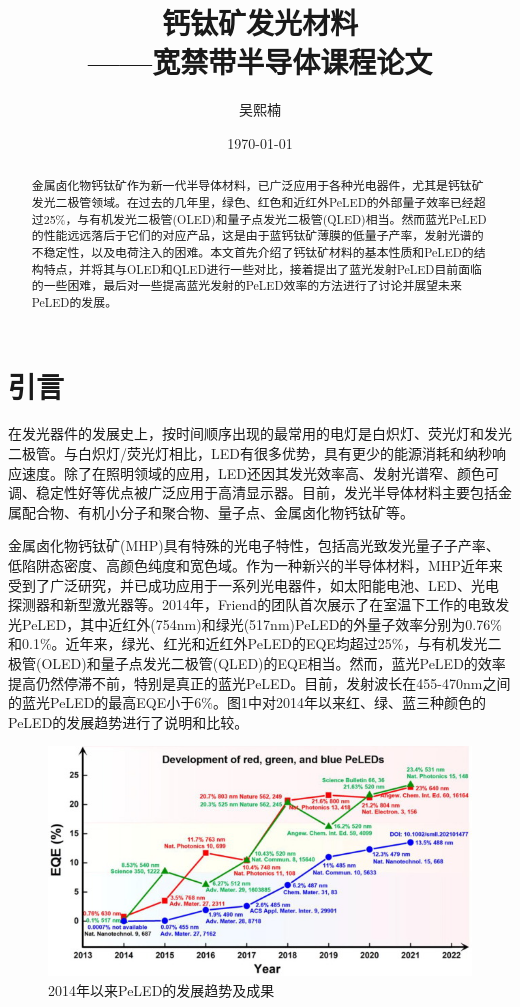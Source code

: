 \documentclass{phyasgn}\usepackage{nag}
\title{
  {钙钛矿发光材料}\\[-8pt]
    {\normalsize ——宽禁带半导体课程论文}
}
\author{吴熙楠}
\date{\today}
\begin{document}
\maketitle
\begin{abstract}
金属卤化物钙钛矿作为新一代半导体材料，已广泛应用于各种光电器件，尤其是钙钛矿发光二极管领域。在过去的几年里，绿色、红色和近红外PeLED的外部量子效率已经超过25\%，与有机发光二极管(OLED)和量子点发光二极管(QLED)相当。然而蓝光PeLED的性能远远落后于它们的对应产品，这是由于蓝钙钛矿薄膜的低量子产率，发射光谱的不稳定性，以及电荷注入的困难。本文首先介绍了钙钛矿材料的基本性质和PeLED的结构特点，并将其与OLED和QLED进行一些对比，接着提出了蓝光发射PeLED目前面临的一些困难，最后对一些提高蓝光发射的PeLED效率的方法进行了讨论并展望未来PeLED的发展。
\end{abstract}
\tableofcontents
\section{引言}
在发光器件的发展史上，按时间顺序出现的最常用的电灯是白炽灯、荧光灯和发光二极管。与白炽灯/荧光灯相比，LED有很多优势，具有更少的能源消耗和纳秒响应速度。除了在照明领域的应用，LED还因其发光效率高、发射光谱窄、颜色可调、稳定性好等优点被广泛应用于高清显示器。目前，发光半导体材料主要包括金属配合物、有机小分子和聚合物、量子点、金属卤化物钙钛矿等。
\par 金属卤化物钙钛矿(MHP)具有特殊的光电子特性，包括高光致发光量子子产率、低陷阱态密度、高颜色纯度和宽色域。作为一种新兴的半导体材料，MHP近年来受到了广泛研究，并已成功应用于一系列光电器件，如太阳能电池、LED、光电探测器和新型激光器等。2014年，Friend的团队首次展示了在室温下工作的电致发光PeLED，其中近红外(754nm)和绿光(517nm)PeLED的外量子效率分别为0.76\%和0.1\%。近年来，绿光、红光和近红外PeLED的EQE均超过25\%，与有机发光二极管(OLED)和量子点发光二极管(QLED)的EQE相当。然而，蓝光PeLED的效率提高仍然停滞不前，特别是真正的蓝光PeLED。目前，发射波长在455-470nm之间的蓝光PeLED的最高EQE小于6\%。图1中对2014年以来红、绿、蓝三种颜色的PeLED的发展趋势进行了说明和比较。
\begin{figure}[H]
	\centering
	\hspace{2em}\includegraphics[width=.8\linewidth]{pic/5.jpg}
	\caption{2014年以来PeLED的发展趋势及成果\cite{zhang2021blue}
	}
\end{figure}
\end{document}
